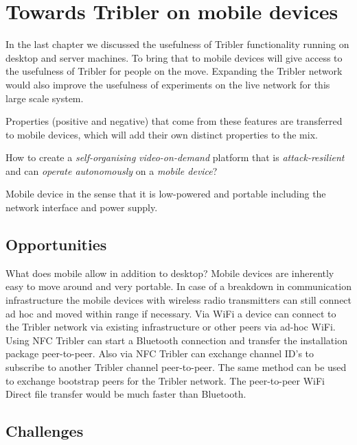 \section{Towards Tribler on mobile devices}
\label{ch:tribler_mobile}

In the last chapter we discussed the usefulness of Tribler functionality running on desktop and server machines.
To bring that to mobile devices will give access to the usefulness of Tribler for people on the move.
Expanding the Tribler network would also improve the usefulness of experiments on the live network for this large scale system.

Properties (positive and negative) that come from these features are transferred to mobile devices, which will add their own distinct properties to the mix.


How to create a \emph{self-organising} \emph{video-on-demand} platform that is \emph{attack-resilient} and can \emph{operate autonomously} on a \emph{mobile device}?

Mobile device in the sense that it is low-powered and portable including the network interface and power supply.



\subsection{Opportunities}

What does mobile allow in addition to desktop?
Mobile devices are inherently easy to move around and very portable.
In case of a breakdown in communication infrastructure the mobile devices with wireless radio transmitters can still connect ad hoc and moved within range if necessary.
Via WiFi a device can connect to the Tribler network via existing infrastructure or other peers via ad-hoc WiFi.
Using NFC Tribler can start a Bluetooth connection and transfer the installation package peer-to-peer.
Also via NFC Tribler can exchange channel ID's to subscribe to another Tribler channel peer-to-peer.
The same method can be used to exchange bootstrap peers for the Tribler network.
The peer-to-peer WiFi Direct file transfer would be much faster than Bluetooth.



\subsection{Challenges}

